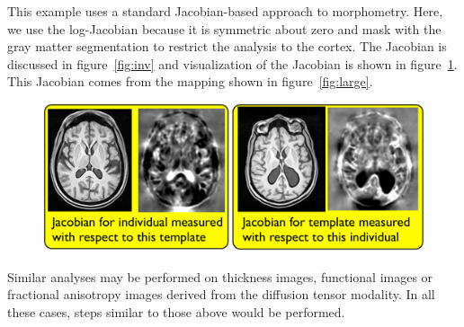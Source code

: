 \documentclass{InsightArticle}
\begin{document}
This example uses a standard Jacobian-based approach to morphometry.
Here, we use the log-Jacobian because it is symmetric about zero and
mask with the gray matter segmentation to restrict the analysis to the
cortex.  The Jacobian is discussed in figure~\ref{fig:inv} and visualization of
the Jacobian is shown in figure~\ref{fig:jac}.  This Jacobian comes
from the mapping shown in figure~\ref{fig:large}.
\begin{figure}
\includegraphics[width=1\textwidth]{Figures/Jacobian.pdf}
\label{fig:jac}
\end{figure}
Similar analyses may be performed on thickness images, functional 
images or fractional anisotropy images derived from the diffusion 
tensor modality.  In all these cases, steps similar to those above 
would be performed.  
\end{document}
